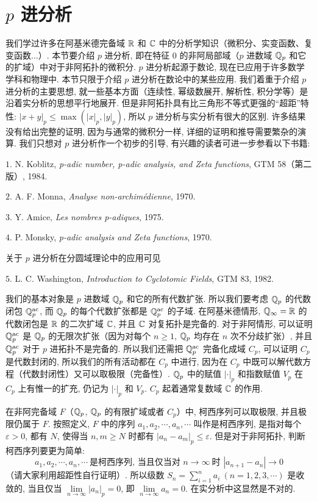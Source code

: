 \section{$p$ 进分析}\label{sec:ch9-s4}

我们学过许多在阿基米德完备域 $\mathbb{R}$ 和 $\mathbb{C}$ 中的分析学知识（微积分、实变函数、复变函数...）. 本节要介绍 $p$ 进分析, 即在特征 $0$ 的非阿局部域（$p$ 进数域 $\mathbb{Q}_p$ 和它的扩域）中对于非阿拓扑的微积分. $p$ 进分析起源于数论, 现在已应用于许多数学学科和物理中. 本节只限于介绍 $p$ 进分析在数论中的某些应用. 我们着重于介绍 $p$ 进分析的主要思想, 就一些基本方面（连续性, 幂级数展开, 解析性, 积分学等）是沿着实分析的思想平行地展开. 但是非阿拓扑具有比三角形不等式更强的``超距''特性: $|x+y|_p\leqslant\max(|x|_p,|y|_p)$, 所以 $p$ 进分析与实分析有很大的区别. 许多结果没有给出完整的证明, 因为与通常的微积分一样, 详细的证明和推导需要繁杂的演算. 我们只想对 $p$ 进分析作一个初步的引导, 有兴趣的读者可进一步参看以下书籍:

$1$. N. Koblitz, \emph{p-adic number, p-adic analysis, and Zeta functions}, GTM 58（第二版）, 1984.

$2$. A. F. Monna, \emph{Analyse non-archim\'edienne}, 1970.

$3$. Y. Amice, \emph{Les nombres p-adiques}, 1975.

$4$. P. Monsky, \emph{p-adic analysis and Zeta functions}, 1970.

关于 $p$ 进分析在分圆域理论中的应用可见

$5$. L. C. Washington, \emph{Introduction to Cyclotomic Fields}, GTM 83, 1982.

我们的基本对象是 $p$ 进数域 $\mathbb{Q}_p$ 和它的所有代数扩张. 所以我们要考虑 $\mathbb{Q}_p$ 的代数闭包 $\mathbb{Q}_p^{\mathrm{ac}}$, 而 $\mathbb{Q}_p$ 的每个代数扩张都是 $\mathbb{Q}_p^{\mathrm{ac}}$ 的子域. 在阿基米德情形, $\mathbb{Q}_{\infty}=\mathbb{R}$ 的代数闭包是 $\mathbb{R}$ 的二次扩域 $\mathbb{C}$, 并且 $\mathbb{C}$ 对复拓扑是完备的. 对于非阿情形, 可以证明 $\mathbb{Q}_p^{\mathrm{ac}}$ 是 $\mathbb{Q}_p$ 的无限次扩张（因为对每个 $n\geqslant 1$, $\mathbb{Q}_p$ 均存在 $n$ 次不分歧扩张）, 并且 $\mathbb{Q}_p^{\mathrm{ac}}$ 对于 $p$ 进拓扑不是完备的. 所以我们还需把 $\mathbb{Q}_p^{\mathrm{ac}}$ 完备化成域 $C_p$, 可以证明 $C_p$ 是代数封闭的, 所以我们的所有活动都在 $C_p$ 中进行, 因为在 $C_p$ 中既可以解代数方程（代数封闭性）又可以取极限（完备性）. $\mathbb{Q}_p$ 中的赋值 $|\cdot|_p$ 和指数赋值 $V_p$ 在 $C_p$ 上有惟一的扩充, 仍记为 $|\cdot|_p$ 和 $V_p$. $C_p$ 起着通常复数域 $\mathbb{C}$ 的作用.

在非阿完备域 $F$（$\mathbb{Q}_p$, $\mathbb{Q}_p$ 的有限扩域或者 $C_p$）中, 柯西序列可以取极限, 并且极限仍属于 $F$. 按照定义, $F$ 中的序列 $a_1,a_2,\cdots,a_n,\cdots$ 叫作是柯西序列, 是指对每个 $\varepsilon>0$, 都有 $N$, 使得当 $n,m\geqslant N$ 时都有 $|a_n-a_m|_p\leqslant\varepsilon$. 但是对于非阿拓扑, 判断柯西序列要更为简单:
\[
  a_1,a_2,\cdots,a_n,\cdots\ \text{是柯西序列, 当且仅当对 } n\to\infty\ \text{时 } |a_{n+1}-a_n|\to 0
\]
（请大家利用超距性自行证明）. 所以级数 $S_n=\sum_{i=1}^{n}a_i\ (n=1,2,3,\cdots)$ 是收敛的, 当且仅当 $\lim\limits_{n\to\infty}|a_n|_p=0$, 即 $\lim\limits_{n\to\infty}a_n=0$. 在实分析中这显然是不对的.

